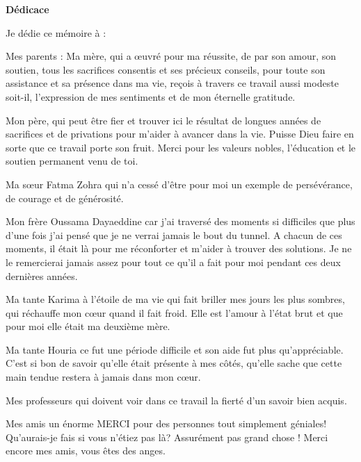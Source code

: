 
\thispagestyle{empty}

\begin{center}
	\LARGE{\textbf{Dédicace}}
\end{center}

Je dédie ce mémoire à :


Mes parents : Ma mère, qui a œuvré pour ma réussite, de par son amour, son soutien, tous les sacrifices consentis et ses précieux conseils, pour toute son assistance et sa présence dans ma vie, reçois à travers ce travail aussi modeste soit-il, l'expression de mes sentiments et de mon éternelle gratitude.

Mon père, qui peut être fier et trouver ici le résultat de longues années de sacrifices et de privations pour m'aider à avancer dans la vie. Puisse Dieu faire en sorte que ce travail porte son fruit. Merci pour les valeurs nobles, l'éducation et le soutien permanent venu de toi.

Ma sœur Fatma Zohra qui n’a cessé d'être pour moi un exemple de persévérance, de courage et de générosité.

Mon frère Oussama  Dayaeddine car j'ai traversé des moments si difficiles que plus d'une fois j'ai pensé que je ne verrai jamais le bout du tunnel. A chacun de ces moments, il était là pour me réconforter et m'aider à trouver des solutions. Je ne le remercierai jamais assez pour tout ce qu’il a fait pour moi pendant ces deux dernières années.

\vspace*{0.3cm}


Ma tante Karima à l’étoile de ma vie qui fait briller mes jours les plus sombres, qui réchauffe mon cœur quand il fait froid. Elle est l’amour à l’état brut et que pour moi elle était ma deuxième mère.

Ma tante Houria ce fut une période difficile et son aide fut plus qu’appréciable. C'est si bon de savoir qu’elle était présente à mes côtés, qu’elle sache que cette main tendue restera à jamais dans mon cœur.

Mes professeurs  qui doivent voir dans ce travail la fierté d'un savoir bien acquis.  

Mes amis  un énorme MERCI pour des personnes tout simplement géniales! Qu'aurais-je fais si vous n'étiez pas là? Assurément pas grand chose ! Merci encore mes amis, vous êtes des anges.



\vspace*{1cm}
            
